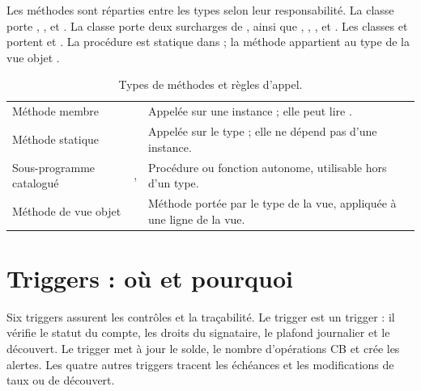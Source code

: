 Les méthodes sont réparties entre les types selon leur responsabilité. La
classe  porte , ,
 et . La classe
 porte deux surcharges de , ainsi que
, , ,
 et . Les classes  et
 portent  et
. La procédure  est statique dans
 ; la méthode  appartient au type de la vue
objet .

\begin{table}[htbp]
  \centering
  \small
  \caption{Types de méthodes et règles d'appel.}
  \label{tab:types-methodes}
  \begin{tabularx}{\textwidth}{@{}L{2.7cm}L{5.2cm}X@{}}
    \toprule
     &  &  \\
    \midrule
    Méthode membre &
     &
    Appelée sur une instance ; elle peut lire . \\
    Méthode statique &
     &
    Appelée sur le type ; elle ne dépend pas d'une instance. \\
    Sous-programme catalogué &
    ,  &
    Procédure ou fonction autonome, utilisable hors d'un type. \\
    Méthode de vue objet &
     &
    Méthode portée par le type de la vue, appliquée à une ligne de la vue. \\
    \bottomrule
  \end{tabularx}
\end{table}

\section{Triggers : où et pourquoi}

Six triggers assurent les contrôles et la traçabilité. Le trigger
 est un trigger  : il vérifie le statut du
compte, les droits du signataire, le plafond journalier et le découvert. Le
trigger  met à jour le solde, le nombre d'opérations CB et
crée les alertes. Les quatre autres triggers tracent les échéances et les
modifications de taux ou de découvert.

